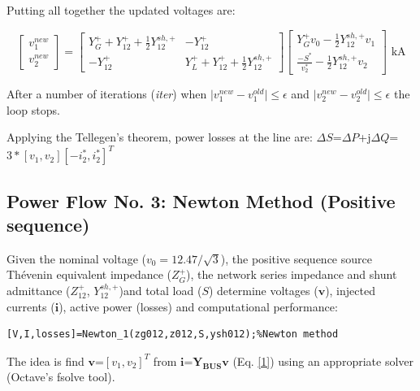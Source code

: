 \documentclass[12pt]{article}
\begin{document}
Putting all together the updated voltages are:

\begin{equation}
\begin{bmatrix}
	{v}^{new}_1\\ 
	{v}^{new}_2
\end{bmatrix}=
 \left[ \begin{array}{cc}
               {Y}^{+}_{G}+{Y}^{+}_{12}+\frac{
1}{2}{Y}^{sh,+}_{12} &-{Y}^{+}_{12} \\
              -{Y}^{+}_{12}  & {Y}^{+}_{L}+{Y}^{+}_{12}+\frac{
1}{2}{Y}^{sh,+}_{12}
             \end{array}
           \right]
  \begin{bmatrix}
  {Y}^{+}_{G}v_0-\frac{1}{2}{Y}^{sh,+}_{12}v_1\\
  \frac{-{S}^*}{{v}^*_2}-\frac{1}{2}{Y}^{sh,+}_{12}v_2\end{bmatrix}
    \mbox{ kA}
\end{equation}

After a number of iterations (\textit{iter}) when  $\mid{v}^{new}_1-{v}^{old}_1\mid\leq \epsilon$ and $\mid{v}^{new}_2-{v}^{old}_2\mid\leq \epsilon$ the loop stops. 

Applying the Tellegen's theorem, power losses at the line are: $\Delta {S}$=$\Delta P$+j$\Delta Q$=$3*[{v}_1,{v}_2][-{i}^*_2,{i}^*_2]^T$

\subsection{Power Flow No. 3: Newton Method (Positive sequence)}

Given the nominal voltage ($v_0=12.47/\sqrt{3}$), the positive sequence source Th\'evenin equivalent impedance (${Z}^{+}_{G}$), the network series impedance and shunt admittance (${Z}^{+}_{12}$, ${Y}^{sh,+}_{12}$)and total load (${S}$)
determine voltages ($\bm{v}$), injected currents ($\mathbf{i}$), active power (losses) and computational performance:
    
\begin{verbatim}
[V,I,losses]=Newton_1(zg012,z012,S,ysh012);%Newton method
\end{verbatim}

The idea is find $\bm{v}$=$[{v}_1,{v}_2]^T$ from $\bm{i}$=$\mathbf{Y_{BUS}}\bm{v}$ (Eq. \ref{1}) using an appropriate solver (Octave's {fsolve} tool).
\end{document}
